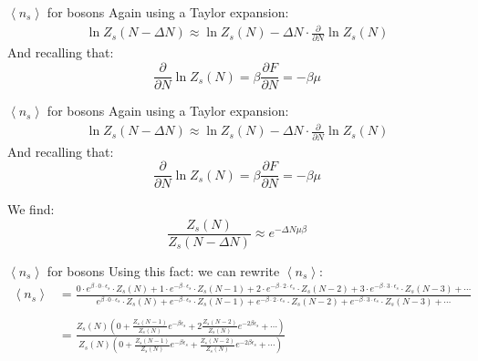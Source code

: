 \documentclass{beamer}
\begin{document}
\begin{frame}{$\left<n_s\right>$ for bosons}
	Again using a Taylor expansion:
	\begin{align*}
		\ln{Z_s(N-\Delta N)}\approx \ln{Z_s(N)}-\Delta N\cdot\frac{\partial}{\partial N}\ln{Z_s(N)}
	\end{align*}
	And recalling that:
	\begin{equation*}
		\frac{\partial}{\partial N}\ln{Z_s(N)}=\beta\frac{\partial F}{\partial N}=-\beta \mu
	\end{equation*}
\end{frame}


\begin{frame}{$\left<n_s\right>$ for bosons}
	Again using a Taylor expansion:
	\begin{align*}
		\ln{Z_s(N-\Delta N)}\approx \ln{Z_s(N)}-\Delta N\cdot\frac{\partial}{\partial N}\ln{Z_s(N)}
	\end{align*}
	And recalling that:
	\begin{equation*}
		\frac{\partial}{\partial N}\ln{Z_s(N)}=\beta\frac{\partial F}{\partial N}=-\beta \mu
	\end{equation*}

We find:
\begin{equation*}
	\frac{Z_s(N)}{Z_s(N-\Delta N)}\approx e^{-\Delta N\mu \beta}
\end{equation*}
\end{frame}

\begin{frame}{$\left<n_s\right>$ for bosons}
	Using this fact: we can rewrite $\left<n_s\right>$:
	\tiny
\begin{align*}
	\left<n_s\right>&=\frac{0\cdot e^{\beta\cdot 0\cdot \epsilon_s}\cdot Z_s(N)+1\cdot e^{-\beta\cdot\epsilon_s}\cdot Z_s(N-1)+2\cdot e^{-\beta\cdot2\cdot\epsilon_s}\cdot Z_s(N-2)+3\cdot e^{-\beta\cdot3\cdot\epsilon_s}\cdot Z_s(N-3)+\cdots}{ e^{\beta\cdot 0\cdot \epsilon_s}\cdot Z_s(N)+ e^{-\beta\cdot\epsilon_s}\cdot Z_s(N-1)+ e^{-\beta\cdot2\cdot\epsilon_s}\cdot Z_s(N-2)+ e^{-\beta\cdot3\cdot\epsilon_s}\cdot Z_s(N-3)+\cdots}\\ \\
	&=\frac{Z_s(N)\left(0+\frac{Z_s(N-1)}{Z_s(N)}e^{-\beta \epsilon_s}+2\frac{Z_s(N-2)}{Z_s(N)}e^{-2\beta\epsilon_s}+\cdots\right)}{Z_s(N)\left(0+\frac{Z_s(N-1)}{Z_s(N)}e^{-\beta \epsilon_s}+\frac{Z_s(N-2)}{Z_s(N)}e^{-2\beta\epsilon_s}+\cdots\right)}
\end{align*}
	
\end{frame}
\end{document}
